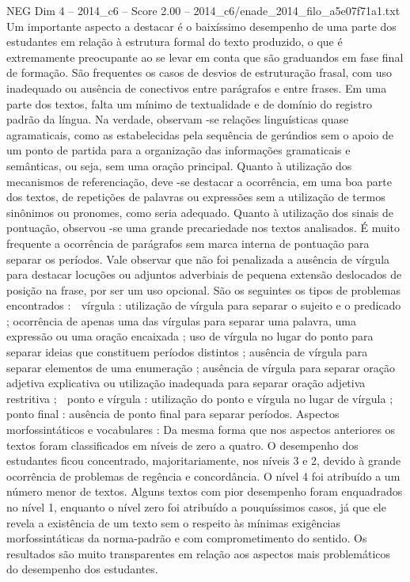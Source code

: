 \begin{textsample}{NEG Dim 4 – 2014\_c6 – Score 2.00 – 2014\_c6/enade\_2014\_filo\_a5e07f71a1.txt}
Um importante aspecto a destacar é o baixíssimo desempenho de uma parte dos estudantes em relação à estrutura formal do texto produzido, o que é extremamente preocupante ao se levar em conta que são graduandos em fase final de formação.
São frequentes os casos de desvios de estruturação frasal, com uso inadequado ou ausência de conectivos entre parágrafos e entre frases.
Em uma parte dos textos, falta um mínimo de textualidade e de domínio do registro padrão da língua.
Na verdade, observam -se relações linguísticas quase agramaticais, como as estabelecidas pela sequência de gerúndios sem o apoio de um ponto de partida para a organização das informações gramaticais e semânticas, ou seja, sem uma oração principal.
Quanto à utilização dos mecanismos de referenciação, deve -se destacar a ocorrência, em uma boa parte dos textos, de repetições de palavras ou expressões sem a utilização de termos sinônimos ou pronomes, como seria adequado.
Quanto à utilização dos sinais de pontuação, observou -se uma grande precariedade nos textos analisados.
É muito frequente a ocorrência de parágrafos sem marca interna de pontuação para separar os períodos.
Vale observar que não foi penalizada a ausência de vírgula para destacar locuções ou adjuntos adverbiais de pequena extensão deslocados de posição na frase, por ser um uso opcional.
São os seguintes os tipos de problemas encontrados :  vírgula : utilização de vírgula para separar o sujeito e o predicado ; ocorrência de apenas uma das vírgulas para separar uma palavra, uma expressão ou uma oração encaixada ; uso de vírgula no lugar do ponto para separar ideias que constituem períodos distintos ; ausência de vírgula para separar elementos de uma enumeração ; ausência de vírgula para separar oração adjetiva explicativa ou utilização inadequada para separar oração adjetiva restritiva ;  ponto e vírgula : utilização do ponto e vírgula no lugar de vírgula ;  ponto final : ausência de ponto final para separar períodos.
Aspectos morfossintáticos e vocabulares : Da mesma forma que nos aspectos anteriores os textos foram classificados em níveis de zero a quatro.
O desempenho dos estudantes ficou concentrado, majoritariamente, nos níveis 3 e 2, devido à grande ocorrência de problemas de regência e concordância.
O nível 4 foi atribuído a um número menor de textos.
Alguns textos com pior desempenho foram enquadrados no nível 1, enquanto o nível zero foi atribuído a pouquíssimos casos, já que ele revela a existência de um texto sem o respeito às mínimas exigências morfossintáticas da norma-padrão e com comprometimento do sentido.
Os resultados são muito transparentes em relação aos aspectos mais problemáticos do desempenho dos estudantes.

\end{textsample}
